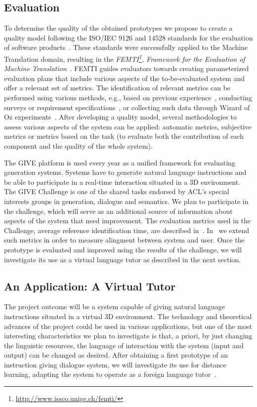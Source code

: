 \subsection{Evaluation}
To determine the quality of the obtained prototypes we propose to create a
quality model following the ISO/IEC
9126 and 14528 standards for the evaluation of software
products~\cite{ISO9126-1,ISO14598-1}. These standards were successfully applied
to
the Machine Translation domain, resulting in the
\emph{FEMTI\footnote{\url{http://www.issco.unige.ch/femti/}}, Framework for the
Evaluation of
Machine Translation}~\cite{Est2005}. FEMTI
guides evaluators towards creating parameterized evaluation
plans that include various aspects of the to-be-evaluated system and offer a
relevant set of metrics. The identification of relevant metrics can be performed
using various methods, e.g., based on previous
experience~\cite{paradise06,Litman2002}, conducting
surveys or requirement specifications~\cite{Lecoeuche98}, or
collecting such data through Wizard of Oz
experiments~\cite{Dahlback93}.
After developing a quality model, several methodologies to assess
various aspects of the system can be applied: automatic metrics,
subjective metrics or metrics based on the task (to
evaluate both the contribution of each component and the quality of the whole
system). 

The GIVE platform is used every year as a unified framework for evaluating
generation systems. Systems have to generate natural language
instructions and be able to participate in a real-time interaction situated in a
3D environment. The GIVE Challenge is one of the shared tasks endorsed by
ACL's special interests groups in generation, dialogue and semantics. We plan
to participate in the challenge, which will serve as an additional
source of information about aspects of the system that need
improvement. The evaluation metrics used in the Challenge, average reference
identification time, are described in~\cite{byron09}. In~\cite{amoia10} we
extend such metrics in order to measure alingment between system and user. 
Once the prototype is evaluated and improved using the results
of the challenge, we will investigate its use as a virtual language tutor as
described in the next section.

\subsection{An Application: A Virtual Tutor}\label{applications}

The project outcome will be a system capable of giving natural language
instructions situated in a virtual 3D environment. The technology and
theoretical advances of the project could be used in various applications, but
one of the most interesting characteristics we plan to investigate is that, 
a priori, by just changing the linguistic resources, the language of interaction
with the system (input and output) can be changed as desired. After obtaining a
first prototype of an instruction giving dialogue system, 
 we will investigate its use for distance learning,
adapting the system to operate as a foreign language tutor~\cite{Wik09}.

